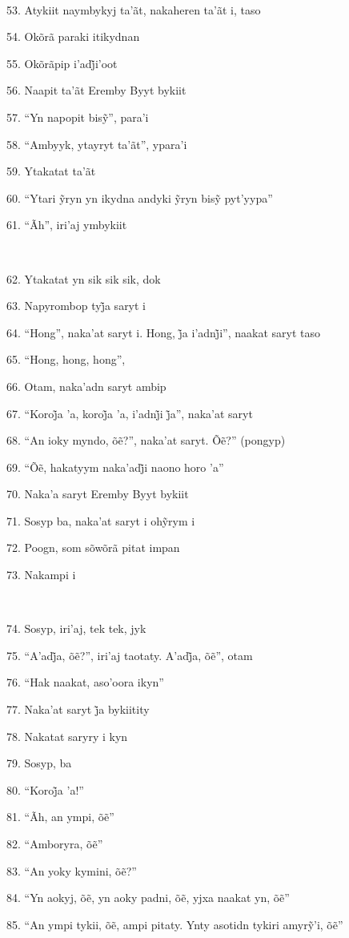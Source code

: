 ~

53. Atykiit naymbykyj ta'ãt, nakaheren ta'ãt i, taso

54. Okõrã paraki itikydnan

55. Okõrãpip i’adj̃i’oot 

56. Naapit ta'ãt Eremby Byyt bykiit

57. ``Yn napopit bisỹ'', para’i

58. ``Ambyyk, ytayryt ta'ãt'', ypara'i

59. Ytakatat ta'ãt

60. ``Ytari ỹryn yn ikydna andyki ỹryn bisỹ pyt’yypa''

61. ``Ãh'', iri'aj ymbykiit

~

62. Ytakatat yn sik sik sik, dok

63. Napyrombop tyj̃a saryt i

64. ``Hong'', naka’at saryt i. Hong, j̃a i’adnj̃i'', naakat saryt taso

65. ``Hong, hong, hong'',

66. Otam, naka'adn saryt ambip

67. ``Koroj̃a ’a, koroj̃a ’a, i’adnj̃i j̃a'', naka’at saryt

68. ``An ioky myndo, õẽ?'', naka’at saryt. Õẽ?'' (pongyp)

69. ``Õẽ, hakatyym naka’adj̃i naono horo ’a''

70. Naka'a saryt Eremby Byyt bykiit

71. Sosyp ba, naka’at saryt i ohỹrym i

72. Poogn, som sõwõrã pitat impan

73. Nakampi i

~

74. Sosyp, iri'aj, tek tek, jyk

75. ``A’adj̃a, õẽ?'', iri’aj taotaty. A’adj̃a, õẽ'', otam

76. ``Hak naakat, aso'oora ikyn''

77. Naka’at saryt j̃a bykiitity

78. Nakatat saryry i kyn

79. Sosyp, ba

80. ``Koroj̃a ’a!''

81. ``Ãh, an ympi, õẽ''

82. ``Amboryra, õẽ''

83. ``An yoky kymini, õẽ?''

84. ``Yn aokyj, õẽ, yn aoky padni, õẽ, yjxa naakat yn, õẽ''

85. ``An ympi tykii, õẽ, ampi pitaty. Ynty asotidn tykiri amyrỹ’i, õẽ''

